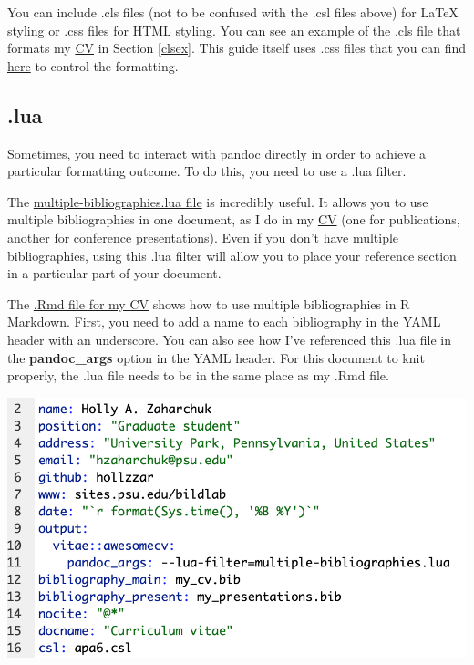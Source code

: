 \documentclass[
]{book}
\begin{document}
You can include .cls files (not to be confused with the .csl files above) for LaTeX styling or .css files for HTML styling. You can see an example of the .cls file that formats my \href{https://github.com/hollzzar/zaharchuk-cv}{CV} in Section \ref{clsex}. This guide itself uses .css files that you can find \href{https://github.com/hollzzar/rmarkdown-guide}{here} to control the formatting.

\hypertarget{luaex}{%
\subsection{.lua}\label{luaex}}

Sometimes, you need to interact with pandoc directly in order to achieve a particular formatting outcome. To do this, you need to use a .lua filter.

The \href{https://github.com/pandoc/lua-filters/tree/master/multiple-bibliographies}{multiple-bibliographies.lua file} is incredibly useful. It allows you to use multiple bibliographies in one document, as I do in my \href{https://github.com/hollzzar/zaharchuk-cv}{CV} (one for publications, another for conference presentations). Even if you don't have multiple bibliographies, using this .lua filter will allow you to place your reference section in a particular part of your document.

The \href{https://github.com/hollzzar/zaharchuk-cv/blob/master/Zaharchuk_CV.Rmd}{.Rmd file for my CV} shows how to use multiple bibliographies in R Markdown. First, you need to add a name to each bibliography in the YAML header with an underscore. You can also see how I've referenced this .lua file in the \textbf{pandoc\_args} option in the YAML header. For this document to knit properly, the .lua file needs to be in the same place as my .Rmd file.

\includegraphics[width=12.72in]{images/references_example}
\end{document}
